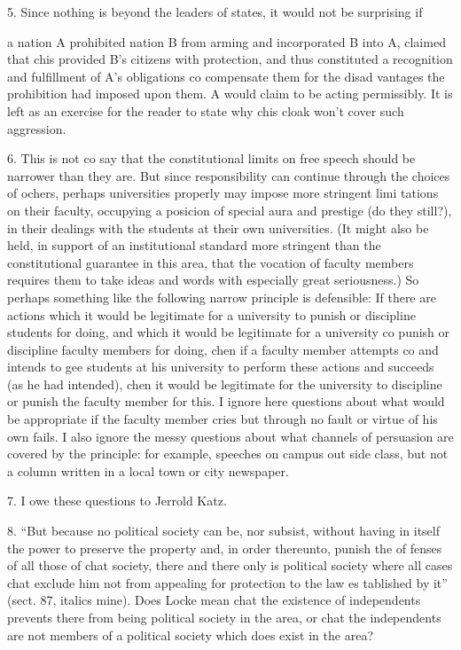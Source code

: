 \documentclass[11pt,openany]{book}
\begin{document}
{5. Since nothing is beyond the leaders of states, it would not be surprising if\par

a nation A prohibited nation B from arming and incorporated B into A, claimed that chis provided B's citizens with protection, and thus constituted a recognition and fulfillment of A's obligations co compensate them for the disad vantages the prohibition had imposed upon them. A would claim to be acting permissibly. It is left as an exercise for the reader to state why chis cloak won't cover such aggression.\par

6. This is not co say that the constitutional limits on free speech should be narrower than they are. But since responsibility can continue through the choices of ochers, perhaps universities properly may impose more stringent limi tations on their faculty, occupying a posicion of special aura and prestige (do they still?), in their dealings with the students at their own universities. (It might also be held, in support of an institutional standard more stringent than the constitutional guarantee in this area, that the vocation of faculty members requires them to take ideas and words with especially great seriousness.) So perhaps something like the following narrow principle is defensible: If there are actions which it would be legitimate for a university to punish or discipline students for doing, and which it would be legitimate for a university co punish or discipline faculty members for doing, chen if a faculty member attempts co and intends to gee students at his university to perform these actions and succeeds (as he had intended), chen it would be legitimate for the university to discipline or punish the faculty member for this. I ignore here questions about what would be appropriate if the faculty member cries but through no fault or virtue of his own fails. I also ignore the messy questions about what channels of persuasion are covered by the principle: for example, speeches on campus out side class, but not a column written in a local town or city newspaper.\par

7. I owe these questions to Jerrold Katz.\par

8. ``But because no political society can be, nor subsist, without having in itself the power to preserve the property and, in order thereunto, punish the of fenses of all those of chat society, there and there only is political society where all cases chat exclude him not from appealing for protection to the law es tablished by it'' (sect. 87, italics mine). Does Locke mean chat the existence of independents prevents there from being political society in the area, or chat the independents are not members of a political society which does exist in the area?\par

}
\end{document}
